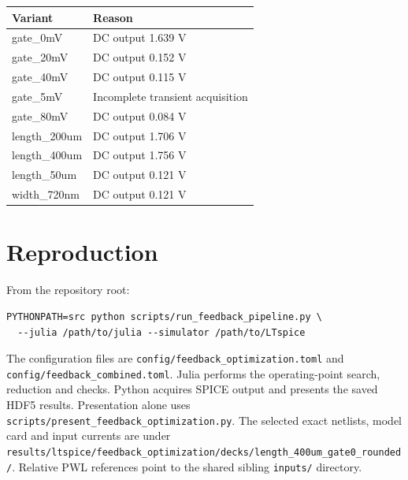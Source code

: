 \documentclass[11pt,a4paper]{article}
\begin{document}
\begin{center}\small\begin{tabular}{ll}\toprule
Variant & Reason\\\midrule
gate\_0mV & DC output 1.639 V \\
gate\_20mV & DC output 0.152 V \\
gate\_40mV & DC output 0.115 V \\
gate\_5mV & Incomplete transient acquisition \\
gate\_80mV & DC output 0.084 V \\
length\_200um & DC output 1.706 V \\
length\_400um & DC output 1.756 V \\
length\_50um & DC output 0.121 V \\
width\_720nm & DC output 0.121 V \\
\bottomrule\end{tabular}\end{center}

\section{Reproduction}
From the repository root:
\begin{verbatim}
PYTHONPATH=src python scripts/run_feedback_pipeline.py \
  --julia /path/to/julia --simulator /path/to/LTspice
\end{verbatim}
The configuration files are \texttt{config/feedback\_optimization.toml} and
\texttt{config/feedback\_combined.toml}. Julia performs the operating-point search,
reduction and checks. Python acquires SPICE output and presents the saved HDF5
results. Presentation alone uses \texttt{scripts/present\_feedback\_optimization.py}.
The selected exact netlists, model card and input currents are under
\texttt{results/ltspice/feedback\_optimization/decks/length\_400um\_gate0\_rounded/}.
Relative PWL references point to the shared sibling \texttt{inputs/} directory.
\end{document}

